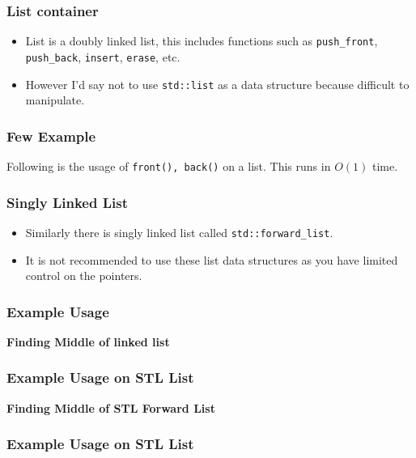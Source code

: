 \begin{frame}
    \frametitle{List container}

    
    \begin{itemize}
        \item List is a doubly linked list, this includes functions such as \texttt{push\_front}, \texttt{push\_back}, \texttt{insert}, \texttt{erase}, etc.\pause[]
        \item However I'd say not to use \texttt{std::list} as a data structure because difficult to manipulate.
    \end{itemize}

\end{frame}

\begin{frame}
    \frametitle{Few Example}

    
    Following is the usage of \texttt{front(), back()} on a list. This runs in $O(1)$ time.\pause[]

    
\end{frame}

\begin{frame}
    \frametitle{Singly Linked List}

    \begin{itemize}
        \item Similarly there is singly linked list called \texttt{std::forward\_list}.\pause[]
        \item It is not recommended to use these list data structures as you have limited control on the pointers.
    \end{itemize}
\end{frame}

\begin{frame}
    \frametitle{Example Usage}

    \textbf{Finding Middle of linked list}
    

\end{frame}


\begin{frame}
    \frametitle{Example Usage on STL List}

    \textbf{Finding Middle of STL Forward List}
    

\end{frame}


\begin{frame}
    \frametitle{Example Usage on STL List}

    

\end{frame}


